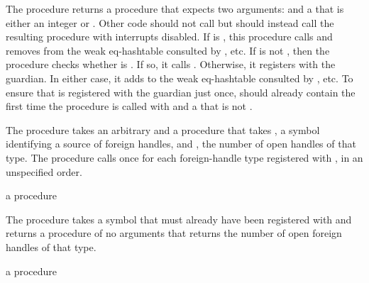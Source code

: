 The  procedure returns a procedure
that expects two arguments:  and a  that is
either an integer or .
Other code should not call  but should instead
call the resulting procedure with interrupts disabled.
If  is , this procedure calls
and removes  from the weak eq-hashtable consulted by
, etc.
If  is not , then
the procedure checks whether 
is .
If so, it calls .
Otherwise, it registers  with the guardian.
In either case, it adds  to the weak eq-hashtable
consulted by , etc.
To ensure that  is registered with the guardian just once,
 should already contain  the first time
the procedure is called with  and a  that
is not .

\begin{procedure}
\end{procedure}
\returns{} 

The  procedure takes an arbitrary  and a
procedure  that takes , a symbol 
identifying a source of foreign handles, and , the number of
open handles of that type.
The  procedure calls  once for
each foreign-handle type registered with ,
in an unspecified order.

\begin{procedure}
\end{procedure}
\returns{} a procedure

The  procedure takes a symbol  that
must already have been registered with 
and returns a procedure of no arguments that returns the number of open foreign
handles of that type.

\begin{procedure}
\end{procedure}
\returns{} a procedure


